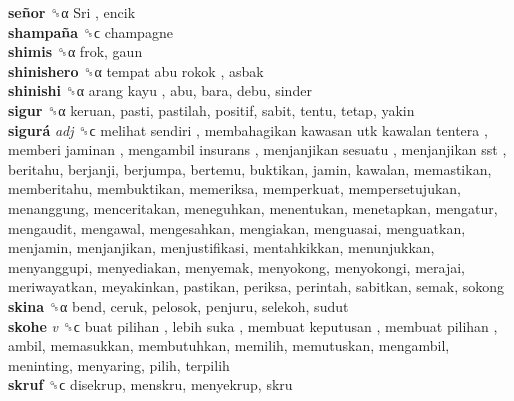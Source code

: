 \textbf{señor} ␝α   Sri , encik  \\
\textbf{shampaña} ␝ϲ  champagne  \\
\textbf{shimis} ␝α  frok, gaun  \\
\textbf{shinishero} ␝α   tempat abu rokok , asbak  \\
\textbf{shinishi} ␝α   arang kayu , abu, bara, debu, sinder  \\
\textbf{sigur} ␝α  keruan, pasti, pastilah, positif, sabit, tentu, tetap, yakin  \\
\textbf{sigurá} \emph{adj}  ␝ϲ   melihat sendiri ,  membahagikan kawasan utk kawalan tentera ,  memberi jaminan ,  mengambil insurans ,  menjanjikan sesuatu ,  menjanjikan sst , beritahu, berjanji, berjumpa, bertemu, buktikan, jamin, kawalan, memastikan, memberitahu, membuktikan, memeriksa, memperkuat, mempersetujukan, menanggung, menceritakan, meneguhkan, menentukan, menetapkan, mengatur, mengaudit, mengawal, mengesahkan, mengiakan, menguasai, menguatkan, menjamin, menjanjikan, menjustifikasi, mentahkikkan, menunjukkan, menyanggupi, menyediakan, menyemak, menyokong, menyokongi, merajai, meriwayatkan, meyakinkan, pastikan, periksa, perintah, sabitkan, semak, sokong  \\
\textbf{skina} ␝α  bend, ceruk, pelosok, penjuru, selekoh, sudut  \\
\textbf{skohe} \emph{v}  ␝ϲ   buat pilihan ,  lebih suka ,  membuat keputusan ,  membuat pilihan , ambil, memasukkan, membutuhkan, memilih, memutuskan, mengambil, meninting, menyaring, pilih, terpilih  \\
\textbf{skruf} ␝ϲ  disekrup, menskru, menyekrup, skru  \\
